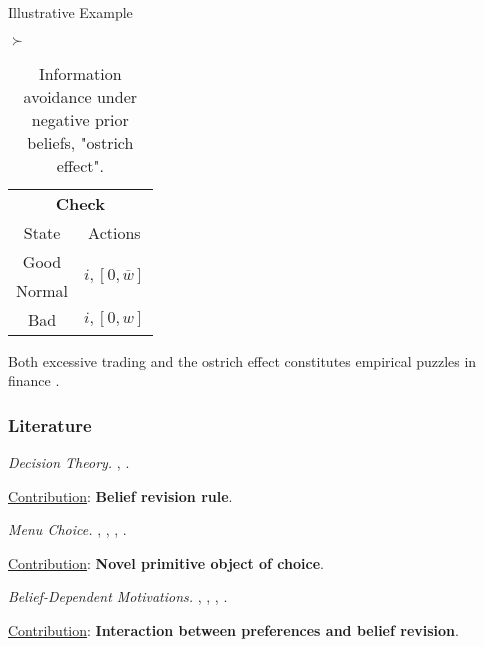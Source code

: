 \documentclass[usenames,dvipsnames,aspectratio=169,11pt, envcountsect]{beamer}
\begin{document}
\begin{frame}[noframenumbering]{Illustrative Example}
\begin{table}[H]
		\( \succ \) %
		\begin{minipage}{0.29\textwidth}
			\centering
			\begin{tabular}{c | c}
				\multicolumn{2}{c}{\textbf{Check}}                                                                            \\
				State                        & Actions                                                                        \\
				\hline
				{\color{bleudefrance}Good}   & \multirow{2}{*}{{\color{bleudefrance}\( i, \left[ 0, \overline{w} \right] \)}} \\
				{\color{bleudefrance}Normal} &                                                                                \\
				Bad                          & \(  i, \left[0, w \right] \)                                                   \\
			\end{tabular}
			\vspace{0.5cm} %
		\end{minipage}
		\caption{Information avoidance under negative prior beliefs, "ostrich effect".} %
		\label{tab:oistrich}
	\end{table}

	Both excessive trading and the ostrich effect constitutes empirical puzzles in finance \citep{danielOverconfidentInvestorsPredictable2015,golmanInformationAvoidance2017}.

\end{frame}

\begin{frame}\frametitle{Literature}

	\begin{wideitemize}
		\item \textit{Decision Theory.} \cite{liangInformationdependentExpectedUtility2017}, \cite{dillenbergerAdditivebeliefbasedPreferences2020} \cite{rommeswinkelPreferenceKnowledge2023}.

		\vspace{0.3cm}
		\underline{Contribution}: \textbf{Belief revision rule}.
		\item \textit{Menu Choice.} \cite{gulTemptationSelfControl2001}, \cite{ozdenorenCompletingStateSpace2002}, \cite{epsteinAxiomaticModelNonBayesian2006}, \cite{epsteinColdFeet2007}.

		\vspace{0.3cm}
		\underline{Contribution}: \textbf{Novel primitive object of choice}.
		\item \textit{Belief-Dependent Motivations.} \cite{eliazCanAnticipatoryFeelings2006}, \cite{benabou2016mindful}, \cite{golmanInformationAvoidance2017}, \cite{battigalliBeliefdependentMotivationsPsychological2022}.

		\vspace{0.3cm}
		\underline{Contribution}: \textbf{Interaction between preferences and belief revision}.
	\end{wideitemize}

\end{frame}
\end{document}
